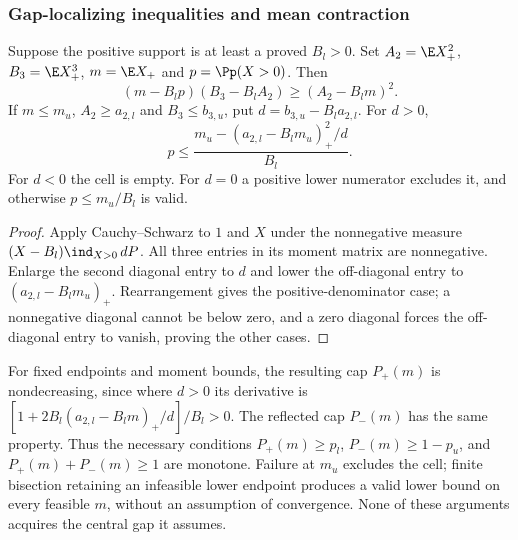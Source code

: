 \subsubsection{Gap-localizing inequalities and mean contraction}
\begin{lemma}\label{ms:finite:gap-localizing}
Suppose the positive support is at least a proved $B_l>0$. Set
$A_2=\E X_+^2$, $B_3=\E X_+^3$, $m=\E X_+$ and $p=\Pp(X>0)$.
Then
\[
 (m-B_lp)(B_3-B_lA_2)\ge(A_2-B_lm)^2.
\]
If $m\le m_u$, $A_2\ge a_{2,l}$ and $B_3\le b_{3,u}$, put
$d=b_{3,u}-B_la_{2,l}$. For $d>0$,
\[
 p\le\frac{m_u-(a_{2,l}-B_lm_u)_+^2/d}{B_l}.
\]
For $d<0$ the cell is empty. For $d=0$ a positive lower numerator
excludes it, and otherwise $p\le m_u/B_l$ is valid.
\end{lemma}
\begin{proof}
Apply Cauchy--Schwarz to $1$ and $X$ under the nonnegative measure
$(X-B_l)\ind_{X>0}\,dP$. All three entries in its moment matrix are
nonnegative. Enlarge the second diagonal entry to $d$ and lower the
off-diagonal entry to $(a_{2,l}-B_lm_u)_+$. Rearrangement gives the
positive-denominator case; a nonnegative diagonal cannot be below zero,
and a zero diagonal forces the off-diagonal entry to vanish, proving the
other cases.
\end{proof}
For fixed endpoints and moment bounds, the resulting cap $P_+(m)$ is
nondecreasing, since where $d>0$ its derivative is
$[1+2B_l(a_{2,l}-B_lm)_+/d]/B_l>0$. The reflected cap $P_-(m)$
has the same property. Thus the necessary conditions
$P_+(m)\ge p_l$, $P_-(m)\ge1-p_u$, and $P_+(m)+P_-(m)\ge1$
are monotone. Failure at $m_u$ excludes the cell; finite bisection
retaining an infeasible lower endpoint produces a valid lower bound on
every feasible $m$, without an assumption of convergence. None of these
arguments acquires the central gap it assumes.

